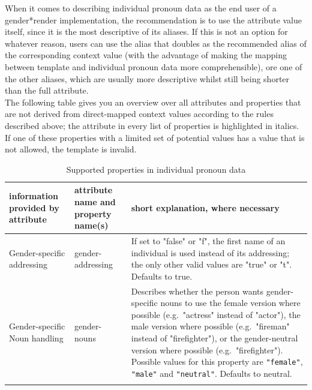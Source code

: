 \documentclass{article}
\newcommand{\GenderRender}{
    gender*render
}
\begin{document}
    When it comes to describing individual pronoun data as the end user of a \GenderRender implementation, the recommendation is to use the attribute value itself, since it is the most descriptive of its aliases.
    If this is not an option for whatever reason, users can use the alias that doubles as the recommended alias of the corresponding context value (with the advantage of making the mapping between template and individual pronoun data more comprehensible), ore one of the other aliases, which are usually more descriptive whilst still being shorter than the full attribute.\\

    The following table gives you an overview over all attributes and properties that are not derived from direct-mapped context values according to the rules described above;
    the attribute in every list of properties is highlighted in italics.
    If one of these properties with a limited set of potential values has a value that is not allowed, the template is invalid.\\

    \begin{flushleft}
        \begin{center}
            \begin{longtable}{|>{\raggedright\arraybackslash}p{7em} | >{\raggedright\arraybackslash}p{9em} | >{\raggedright\arraybackslash}p{14em} |}
                 \hline
                 information provided by attribute & attribute name and property name(s) & short explanation, where necessary\\
                 \hline\hline
                 Gender-specific addressing & gender-addressing & If set to "false" or "f", the first name of an individual is used instead of its addressing;
                 the only other valid values are "true" or "t".
                 Defaults to true.\\
                 \hline
                 Gender-specific Noun handling & gender-nouns & Describes whether the person wants gender-specific nouns to use the female version where possible (e.g.\ "actress" instead of "actor"), the male version where possible (e.g.\ "fireman" instead of "firefighter"), or the gender-neutral version where possible (e.g.\ "firefighter").
                 Possible values for this property are \texttt{"female"}, \texttt{"male"} and \texttt{"neutral"}.
                 Defaults to neutral.\\
                 \hline
                \caption{Supported properties in individual pronoun data}
            \end{longtable}
        \end{center}
    \end{flushleft}
\end{document}
